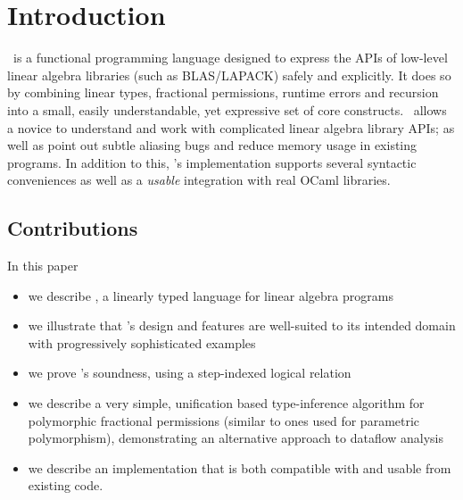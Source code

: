 \section{Introduction}

\lang\ is a functional programming language designed to express the APIs of
low-level linear algebra libraries (such as BLAS/LAPACK) safely and explicitly.
It does so by combining linear types, fractional permissions, runtime errors
and recursion into a small, easily understandable, yet expressive set of core
constructs. \lang\ allows a novice to understand and work with complicated
linear algebra library APIs; as well as point out subtle aliasing bugs and
reduce memory usage in existing programs. In addition to this, \lang's
implementation supports several syntactic conveniences as well as a
\emph{usable} integration with real OCaml libraries.

\subsection{Contributions}

In this paper
\begin{itemize}
    \item we describe \lang, a linearly typed language for linear algebra programs
    \item we illustrate that \lang's design and features are well-suited to its
        intended domain with progressively sophisticated examples
    \item we prove \lang's soundness, using a step-indexed logical relation
    \item we describe a very simple, unification based type-inference algorithm
        for polymorphic fractional permissions (similar to ones used for
        parametric polymorphism), demonstrating an alternative approach to
        dataflow analysis \cite{bierhoff}
    \item we describe an implementation that is both compatible with and usable
        from existing code.
\end{itemize}

